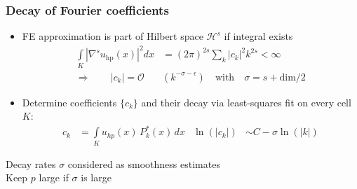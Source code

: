 \begin{frame}
\frametitle{Decay of Fourier coefficients}

\begin{itemize}
\item FE approximation is part of Hilbert space $\mathcal{H}^s$ if integral exists
  \begin{align*}
  \int\limits_K \left| \nabla^s u_{\text{hp}}(x) \right|^2 dx &= (2 \pi)^{2s} \sum\limits_k \left| c_k \right|^2 k^{2s} < \infty \\
  \Rightarrow\qquad |c_k| = \mathcal{O}&\left(k^{-\sigma - \epsilon}\right)  \quad \text{with} \quad \sigma = s + \text{dim}/2
  \end{align*}

\item Determine coefficients $\{c_k\}$ and their decay via least-squares fit on every cell $K$:
  \begin{align*}
  c_k &= \int\limits_K u_{hp}(x) \, P_k^*(x) \, dx & \ln(|c_k|) &\sim C - \sigma \ln\left( |k| \right)
  \end{align*}
\end{itemize}

\vspace{-1em}
\begin{block}{\vspace{-1em}}
\centering
Decay rates $\sigma$ considered as smoothness estimates \\
Keep $p$ large if $\sigma$ is large
\end{block}
\vspace{1em}
\end{frame}